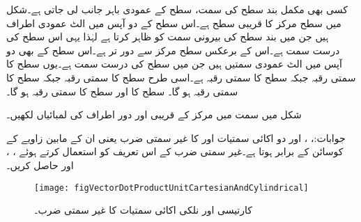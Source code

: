کسی بھی مکمل بند سطح کی  سمت، سطح کے عمودی باہر جانب لی جاتی ہے۔شکل  میں  سطح  مرکز کا قریبی سطح ہے۔اس سطح کے دو آپس میں الٹ عمودی اطراف  ہیں جن میں  بند سطح کی بیرونی سمت کو ظاہر کرتا ہے لہٰذا یہی اس سطح کی درست سمت ہے۔اس کے برعکس  سطح مرکز سے دور تر ہے۔اس سطح کے بھی دو آپس میں الٹ عمودی سمتیں  ہیں جن میں  سطح کی درست سمت ہے۔یوں   سطح کا سمتی رقبہ  جبکہ  سطح کا سمتی رقبہ  ہے۔اسی طرح  سطح کا سمتی رقبہ  جبکہ  سطح کا سمتی رقبہ ہو گا۔ سطح کا  اور  سطح کا سمتی رقبہ  ہو گا۔

شکل  میں  سمت میں مرکز کے قریبی اور دور اطراف کی لمبائیاں لکھیں۔

جوابات:، ،  اور 
دو اکائی سمتیات  اور  کا غیر سمتی ضرب  یعنی ان کے مابین زاویے  کے کوسائن کے برابر ہوتا ہے۔غیر سمتی ضرب کے اس تعریف کو استعمال کرتے ہوئے ، ،  اور  حاصل کریں۔
\begin{figure}
\centering
\texttt{[image: figVectorDotProductUnitCartesianAndCylindrical]}
\caption{کارتیسی اور نلکی اکائی سمتیات کا غیر سمتی ضرب۔}
\label{شکل_سمتیہ_غیر_سمتی_ضرب_بذریعہ_تعریف}
\end{figure}

